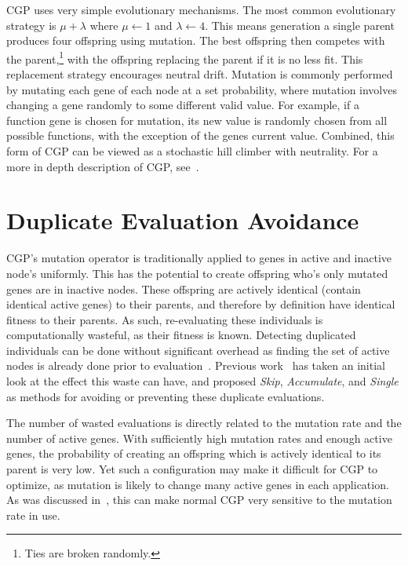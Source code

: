 \documentclass[journal]{IEEEtran}
\begin{document}
CGP uses very simple evolutionary mechanisms.  The most common evolutionary strategy
is $\mu + \lambda$ where $\mu \leftarrow 1$ and $\lambda \leftarrow 4$.
This means generation a single parent produces four offspring using
mutation.  The best offspring then competes with the parent,\footnote{Ties are broken
randomly.} with the offspring
replacing the parent if it is no less fit.  This replacement strategy encourages
neutral drift.  Mutation
is commonly performed by mutating each gene of each node at a set probability, where mutation
involves changing a gene randomly to some different valid value.  For example,
if a function gene is chosen for mutation, its new value is randomly chosen from
all possible functions, with the exception of the genes current value.  Combined,
this form of CGP can be viewed as a stochastic hill climber with neutrality.
For a more in depth description of CGP, see~\cite{miller:2011:chapter2}.

\section{Duplicate Evaluation Avoidance}
\label{sec:duplicate}
CGP's mutation operator is traditionally applied to genes in active and inactive
node's uniformly. This has the
potential to create offspring who's only mutated genes are in inactive nodes.
These offspring are actively identical (contain identical active genes) to their
parents, and therefore by definition have identical fitness to their parents.
As such, re-evaluating these individuals is computationally wasteful, as their fitness
is known.
Detecting duplicated individuals can be done without significant overhead as
finding the set of active nodes is already done prior to
evaluation~\cite{vasicek:2012:efficient}.
Previous work~\cite{goldman:2013:cgpwaste} has taken an initial look at the
effect this waste can have, and proposed \emph{Skip}, \emph{Accumulate}, and
\emph{Single} as methods for avoiding or preventing these duplicate evaluations.

The number of wasted evaluations is
directly related to the mutation rate and the number of active genes.  With
sufficiently high mutation rates and enough active genes, the probability of
creating an offspring which is actively identical to its parent is very low.
Yet such a configuration may make it difficult for CGP to optimize, as mutation
is likely to change many active genes in each application.  As was discussed
in~\cite{goldman:2013:cgpwaste}, this can make normal CGP very sensitive to the
mutation rate in use.
\end{document}
